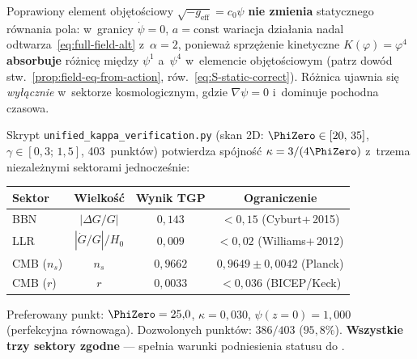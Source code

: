 \begin{remark}%
\label{rem:static-consistency}
Poprawiony element obj\k{e}to\'sciowy $\sqrt{-g_{\mathrm{eff}}} = c_0\psi$
\textbf{nie zmienia} statycznego r\'ownania pola: w~granicy
$\dot\psi = 0$, $a = \mathrm{const}$ wariacja dzia\l{}ania
nadal odtwarza~\eqref{eq:full-field-alt} z~$\alpha = 2$,
poniewa\.z sprz\k{e}\.zenie kinetyczne $K(\varphi) = \varphi^4$
\textbf{absorbuje} r\'o\.znic\k{e} mi\k{e}dzy $\psi^1$ a~$\psi^4$
w~elemencie obj\k{e}to\'sciowym
(patrz dow\'od stw.~\ref{prop:field-eq-from-action},
r\'ow.~\eqref{eq:S-static-correct}).
R\'o\.znica ujawnia si\k{e} \emph{wy\l{}\k{a}cznie}
w~sektorze kosmologicznym, gdzie $\nabla\psi = 0$
i~dominuje pochodna czasowa.
\end{remark}

\begin{remark}[Weryfikacja numeryczna $\kappa = 3/(4\PhiZero)$]%
\label{rem:kappa-verification}
Skrypt \texttt{unified\_kappa\_verification.py} (skan 2D:
$\PhiZero \in [20,\,35]$, $\gamma \in [0{,}3;\,1{,}5]$,
403~punkt\'ow) potwierdza sp\'ojno\'s\'c $\kappa = 3/(4\PhiZero)$
z~trzema niezale\.znymi sektorami jednocze\'snie:

\begin{center}\small
\begin{tabular}{@{}lccc@{}}
\toprule
\textbf{Sektor} & \textbf{Wielko\'s\'c} & \textbf{Wynik TGP}
  & \textbf{Ograniczenie} \\
\midrule
BBN & $|\Delta G/G|$ & $0{,}143$ & $< 0{,}15$ (Cyburt+\,2015) \\
LLR & $|\dot G/G|/H_0$ & $0{,}009$ & $< 0{,}02$ (Williams+\,2012) \\
CMB ($n_s$) & $n_s$ & $0{,}9662$ & $0{,}9649 \pm 0{,}0042$ (Planck) \\
CMB ($r$) & $r$ & $0{,}0033$ & $< 0{,}036$ (BICEP/Keck) \\
\bottomrule
\end{tabular}
\end{center}

\noindent
Preferowany punkt: $\PhiZero = 25{,}0$, $\kappa = 0{,}030$,
$\psi(z{=}0) = 1{,}000$ (perfekcyjna r\'ownowaga).
Dozwolonych punkt\'ow: $386/403$ ($95{,}8\%$).
\textbf{Wszystkie trzy sektory zgodne} --- spe\l{}nia warunki
podniesienia statusu do .
\end{remark}

